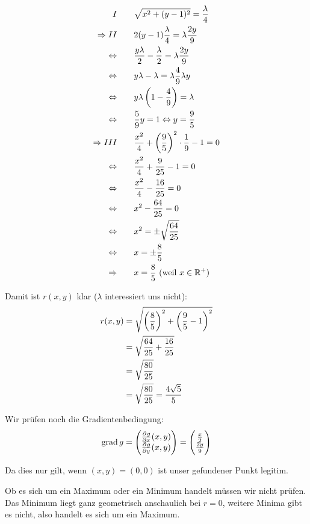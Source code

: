 \documentclass[a4paper,german,12pt,smallheadings]{scrartcl}
\begin{document}
\begin{align*}
  I \qquad &  \sqrt{x^2 + (y-1)^2} = \frac{\lambda}{4} \\
  \Rightarrow II  \qquad &2(y-1) \frac{\lambda}{4}  = \lambda \frac{2y}{9} \\
  \Leftrightarrow\qquad & \frac{y \lambda}{2} - \frac{\lambda}{2}  = \lambda \frac{2y}{9} \\
  \Leftrightarrow\qquad & y \lambda - \lambda  = \lambda \frac{4}{9}\lambda y \\
  \Leftrightarrow\qquad & y \lambda\del{1 - \frac{4}{9}}  = \lambda \\
  \Leftrightarrow\qquad & \frac{5}{9} y = 1 \Leftrightarrow y = \frac{9}{5} \\
  \Rightarrow III \qquad &\frac{x^2}{4} + \del{\frac{9}{5}}^2 \cdot \frac{1}{9} - 1 = 0 \\
  \Leftrightarrow\qquad & \frac{x^2}{4} + \frac{9}{25} - 1 = 0 \\
  \Leftrightarrow\qquad & \frac{x^2}{4} - \frac{16}{25} = 0 \\
  \Leftrightarrow\qquad & x^2 - \frac{64}{25} = 0 \\
  \Leftrightarrow\qquad & x^2  = \pm\sqrt{\frac{64}{25}} \\
  \Leftrightarrow\qquad & x  = \pm \frac{8}{5} \\
  \Rightarrow\qquad & x  = \frac{8}{5} \text{ (weil $x \in \mathbb{R}^+$)} \\
\end{align*}

Damit ist $r(x,y)$ klar ($\lambda$ interessiert uns nicht):
\begin{align*}
  r(x,y) &= \sqrt{\del{\frac{8}{5}}^2 + \del{\frac{9}{5} - 1}^2} \\
         &= \sqrt{\frac{64}{25} + \frac{16}{25}} \\
         &= \sqrt{\frac{80}{25}} \\
         &= \sqrt{\frac{80}{25}} = \frac{4\sqrt{5}}{5}
\end{align*}

Wir prüfen noch die Gradientenbedingung:
\begin{align*}
  \operatorname{grad} g = \begin{pmatrix}
    \pd{g}{x}(x,y) \\
    \pd{g}{y}(x,y)
  \end{pmatrix} = \begin{pmatrix}
    \frac{x}{2} \\
    \frac{2y}{9}
  \end{pmatrix}
\end{align*}

Da dies nur gilt, wenn $(x,y) = (0,0)$ ist unser gefundener Punkt legitim.

Ob es sich um ein Maximum oder ein Minimum handelt müssen wir nicht prüfen. Das
Minimum liegt ganz geometrisch anschaulich bei $r=0$, weitere Minima gibt es
nicht, also handelt es sich um ein Maximum.
\end{document}
